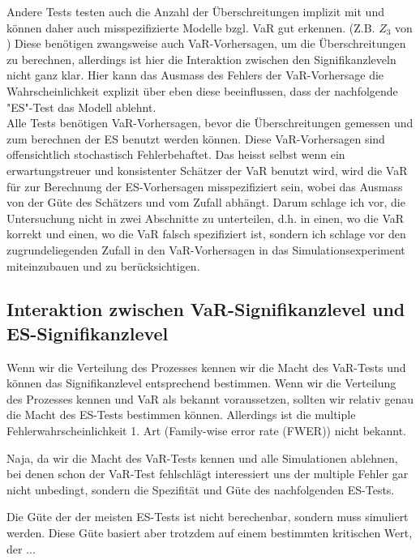 \documentclass[12pt,a4paper]{article}
\begin{document}
	Andere Tests testen auch die Anzahl der Überschreitungen implizit mit und können daher auch misspezifizierte Modelle bzgl. VaR gut erkennen. (Z.B. $Z_3$ von \cite{acerbi_back-testing_2014})
	Diese benötigen zwangsweise auch VaR-Vorhersagen, um die Überschreitungen zu berechnen, allerdings ist hier die Interaktion zwischen den Signifikanzleveln nicht ganz klar.
	Hier kann das Ausmass des Fehlers der VaR-Vorhersage die Wahrscheinlichkeit explizit über eben diese beeinflussen, dass der nachfolgende "ES"-Test das Modell ablehnt.\\
	
	Alle Tests benötigen VaR-Vorhersagen, bevor die Überschreitungen gemessen und zum berechnen der ES benutzt werden können.
	Diese VaR-Vorhersagen sind offensichtlich stochastisch Fehlerbehaftet.
	Das heisst selbst wenn ein erwartungstreuer und konsistenter Schätzer der VaR benutzt wird, wird die VaR
	für zur Berechnung der ES-Vorhersagen misspezifiziert sein, wobei das Ausmass von der Güte des Schätzers und
	vom Zufall abhängt.
	Darum schlage ich vor, die Untersuchung nicht in zwei Abschnitte zu unterteilen, d.h. in einen, wo die VaR korrekt und einen, wo die VaR falsch spezifiziert ist, sondern ich schlage vor den zugrundeliegenden Zufall in den VaR-Vorhersagen in das Simulationsexperiment miteinzubauen und zu berücksichtigen.
	 
	\subsection{Interaktion zwischen VaR-Signifikanzlevel und ES-Signifikanzlevel}
	Wenn wir die Verteilung des Prozesses kennen wir die Macht des VaR-Tests und können das Signifikanzlevel entsprechend bestimmen.
	Wenn wir die Verteilung des Prozesses kennen und VaR als bekannt voraussetzen, sollten wir relativ genau die Macht des ES-Tests bestimmen können.
	Allerdings ist die multiple Fehlerwahrscheinlichkeit 1. Art (Family-wise error rate (FWER)) nicht bekannt.
	
	Naja, da wir die Macht des VaR-Tests kennen und alle Simulationen ablehnen, bei denen schon der VaR-Test fehlschlägt interessiert uns der multiple Fehler gar nicht unbedingt, sondern die Spezifität und Güte des nachfolgenden ES-Tests.
	
	Die Güte der der meisten ES-Tests ist nicht berechenbar, sondern muss simuliert werden. Diese Güte basiert aber trotzdem auf einem bestimmten kritischen Wert, der ... 
	
\end{document}
